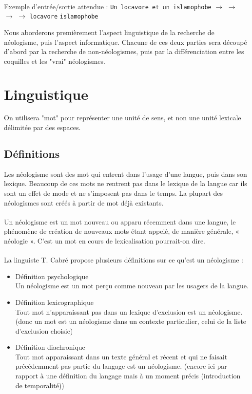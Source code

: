 \documentclass{article}
\begin{document}
\paragraph*{}
Exemple d'entrée/sortie attendue :\newline
\texttt{Un locavore et un islamophobe}\newline
$\rightarrow$ $\rightarrow$ $\rightarrow$ $\rightarrow$\newline
\texttt{locavore}\newline
\texttt{islamophobe}\newline
\par
Nous aborderons premièrement l'aspect linguistique de la recherche de néologisme, puis l'aspect informatique. Chacune de ces deux parties sera découpé d'abord par la recherche de non-néologismes, puis par la différenciation entre les coquilles et les "vrai" néologismes.

\section{Linguistique}

On utilisera "mot" pour représenter une unité de sens, et non une unité lexicale délimitée par des espaces.

\subsection{Définitions}
Les néologisme sont des mot qui entrent dans l'usage d'une langue, puis dans son lexique. Beaucoup de ces mots ne rentrent pas dans le lexique de la langue car ils sont un effet de mode et ne s'imposent pas dans le temps. La plupart des néologismes sont créés à partir de mot déjà existants.
\paragraph*{}
Un néologisme est un mot nouveau ou apparu récemment dans une langue, le phénomène de création de nouveaux mots étant appelé, de manière générale, « néologie ». C'est un mot en cours de lexicalisation pourrait-on dire.
\paragraph*{}
La linguiste T. Cabré propose plusieurs définitions sur ce qu'est un néologisme :
\begin{itemize}
	\item Définition psychologique\\Un néologisme est un mot perçu comme nouveau par les usagers de la langue.
	\item Définition lexicographique\\Tout mot n’apparaissant pas dans un lexique d'exclusion est un néologisme. (donc un mot est un néologisme dans un contexte particulier, celui de la liste d'exclusion choisie)
	\item Définition diachronique\\Tout mot apparaissant dans un texte général et récent et qui ne faisait précédemment pas partie du langage est un néologisme. (encore ici par rapport à une définition du langage mais à un moment précis (introduction de temporalité))
\end{itemize}
\end{document}
